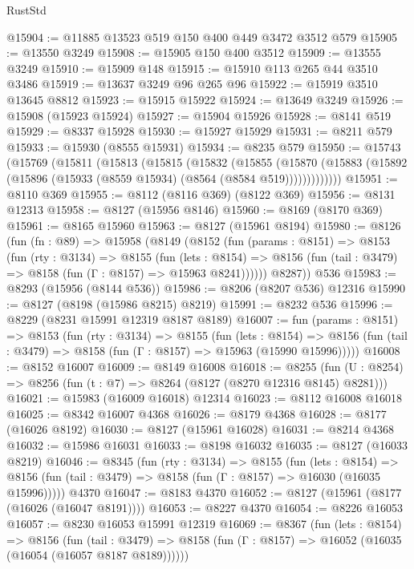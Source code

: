\begin{lexlean}{RustStd}
\begin{coremodule}
@15904 := @11885 @13523 @519 @150 @400 @449 @3472 @3512 @579
@15905 := @13550 @3249
@15908 := @15905 @150 @400 @3512
@15909 := @13555 @3249
@15910 := @15909 @148
@15915 := @15910 @113 @265 @44 @3510 @3486
@15919 := @13637 @3249 @96 @265 @96
@15922 := @15919 @3510 @13645 @8812
@15923 := @15915 @15922
@15924 := @13649 @3249
@15926 := @15908 (@15923 @15924)
@15927 := @15904 @15926
@15928 := @8141 @519
@15929 := @8337 @15928
@15930 := @15927 @15929
@15931 := @8211 @579
@15933 := @15930 (@8555 @15931)
@15934 := @8235 @579
@15950 := @15743
    (@15769
      (@15811
        (@15813
          (@15815
            (@15832
              (@15855
                (@15870
                  (@15883 (@15892 (@15896 (@15933 (@8559 @15934) (@8564 (@8584 @519)))))))))))))
@15951 := @8110 @369
@15955 := @8112 (@8116 @369) (@8122 @369)
@15956 := @8131 @12313
@15958 := @8127 (@15956 @8146)
@15960 := @8169 (@8170 @369)
@15961 := @8165 @15960
@15963 := @8127 (@15961 @8194)
@15980 := @8126
    (fun (fn : @89) =>
    @15958
      (@8149
        (@8152
          (fun (params : @8151) =>
          @8153
            (fun (rty : @3134) =>
            @8155
              (fun (lets : @8154) =>
              @8156 (fun (tail : @3479) => @8158 (fun (Γ : @8157) => @15963 @8241))))))
        @8287))
    @536
@15983 := @8293 (@15956 (@8144 @536))
@15986 := @8206 (@8207 @536) @12316
@15990 := @8127 (@8198 (@15986 @8215) @8219)
@15991 := @8232 @536
@15996 := @8229 (@8231 @15991 @12319 @8187 @8189)
@16007 := fun (params : @8151) =>
  @8153
    (fun (rty : @3134) =>
    @8155
      (fun (lets : @8154) =>
      @8156 (fun (tail : @3479) => @8158 (fun (Γ : @8157) => @15963 (@15990 @15996)))))
@16008 := @8152 @16007
@16009 := @8149 @16008
@16018 := @8255
    (fun (U : @8254) => @8256 (fun (t : @7) => @8264 (@8127 (@8270 @12316 @8145) @8281)))
@16021 := @15983 (@16009 @16018) @12314
@16023 := @8112 @16008 @16018
@16025 := @8342 @16007 @4368
@16026 := @8179 @4368
@16028 := @8177 (@16026 @8192)
@16030 := @8127 (@15961 @16028)
@16031 := @8214 @4368
@16032 := @15986 @16031
@16033 := @8198 @16032
@16035 := @8127 (@16033 @8219)
@16046 := @8345
    (fun (rty : @3134) =>
    @8155
      (fun (lets : @8154) =>
      @8156 (fun (tail : @3479) => @8158 (fun (Γ : @8157) => @16030 (@16035 @15996)))))
    @4370
@16047 := @8183 @4370
@16052 := @8127 (@15961 (@8177 (@16026 (@16047 @8191))))
@16053 := @8227 @4370
@16054 := @8226 @16053
@16057 := @8230 @16053 @15991 @12319
@16069 := @8367
    (fun (lets : @8154) =>
    @8156
      (fun (tail : @3479) =>
      @8158 (fun (Γ : @8157) => @16052 (@16035 (@16054 (@16057 @8187 @8189))))))

\end{coremodule}
\end{lexlean}
